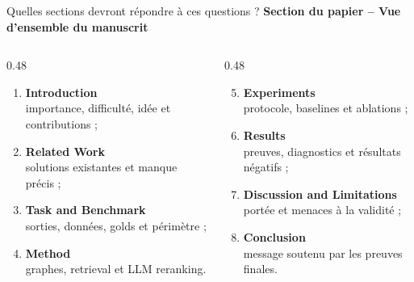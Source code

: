 \documentclass[aspectratio=169,10pt]{beamer}
\newcommand{\papersection}[1]{%
  {\scriptsize\textcolor{accent}{\textbf{Section du papier -- #1}}}\par\vspace{0.55em}}
\begin{document}
\begin{frame}{Quelles sections devront répondre à ces questions ?}
  \papersection{Vue d'ensemble du manuscrit}
  \footnotesize
  \begin{columns}[T,onlytextwidth]
    \begin{column}{0.48\textwidth}
      \begin{enumerate}\setlength{\itemsep}{0.55em}
        \item \textbf{Introduction}\\importance, difficulté, idée et contributions ;
        \item \textbf{Related Work}\\solutions existantes et manque précis ;
        \item \textbf{Task and Benchmark}\\sorties, données, golds et périmètre ;
        \item \textbf{Method}\\graphes, retrieval et LLM reranking.
      \end{enumerate}
    \end{column}
    \begin{column}{0.48\textwidth}
      \begin{enumerate}\setcounter{enumi}{4}\setlength{\itemsep}{0.55em}
        \item \textbf{Experiments}\\protocole, baselines et ablations ;
        \item \textbf{Results}\\preuves, diagnostics et résultats négatifs ;
        \item \textbf{Discussion and Limitations}\\portée et menaces à la validité ;
        \item \textbf{Conclusion}\\message soutenu par les preuves finales.
      \end{enumerate}
    \end{column}
  \end{columns}
\end{frame}
\end{document}
